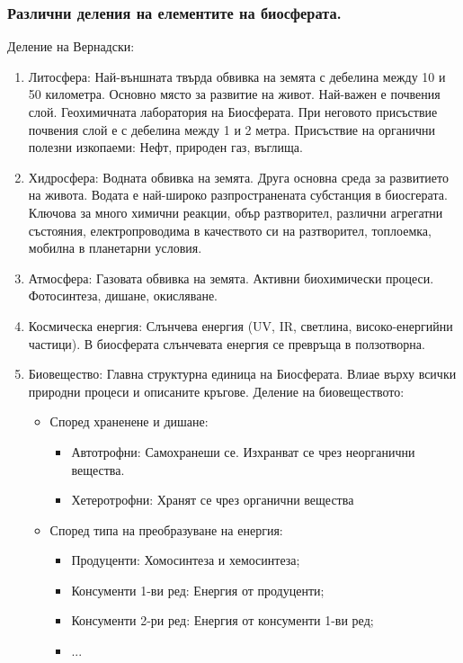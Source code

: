 \documentclass[12pt, a4paper]{article}
\begin{document}
\subsubsection{Различни деления на елементите на биосферата.}
Деление на Вернадски:
\begin{enumerate}
	\item Литосфера: Най-външната твърда обвивка на земята с дебелина между 10 и 50 километра. Основно място за развитие на живот. Най-важен е почвения слой. Геохимичната лаборатория на Биосферата. При неговото присъствие почвения слой е с дебелина между 1 и 2 метра. Присъствие на органични полезни изкопаеми: Нефт, природен газ, въглища.
	\item Хидросфера: Водната обвивка на земята. Друга основна среда за развитието на живота. Водата е най-широко разпространената субстанция в биосгерата. Ключова за много химични реакции, обър разтворител, различни агрегатни състояния, електропроводима в качеството си на разтворител, топлоемка, мобилна в планетарни условия.
	\item Атмосфера: Газовата обвивка на земята. Активни биохимически процеси. Фотосинтеза, дишане, окисляване.
	\item Космическа енергия: Слънчева енергия (UV, IR, светлина, високо-енергийни частици). В биосферата слънчевата енергия се превръща в ползотворна.
	\item Биовещество: Главна структурна единица на Биосферата. Влиае върху всички природни процеси и описаните кръгове. Деление на биовеществото:
	\begin{itemize}
		\item Според храненене и дишане:
		\begin{itemize}
			\item Автотрофни: Самохранеши се. Изхранват се чрез неорганични вещества.
			\item Хетеротрофни: Хранят се чрез органични вещества
		\end{itemize}
		\item Според типа на преобразуване на енергия:
		\begin{itemize}
			\item Продуценти: Хомосинтеза и хемосинтеза;
			\item Консументи 1-ви ред: Енергия от продуценти;
			\item Консументи 2-ри ред: Енергия от консументи 1-ви ред;
			\item ...
		\end{itemize}
	\end{itemize}
\end{enumerate}
\end{document}
